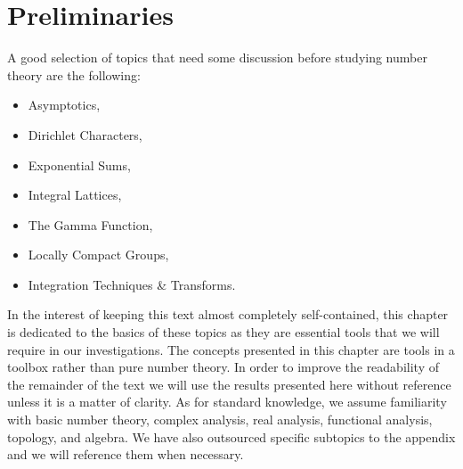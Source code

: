 \chapter{Preliminaries}\label{ch:Preliminaries}
  A good selection of topics that need some discussion before studying number theory are the following:
  \begin{itemize}
    \item Asymptotics,
    \item Dirichlet Characters,
    \item Exponential Sums,
    \item Integral Lattices,
    \item The Gamma Function,
    \item Locally Compact Groups,
    \item Integration Techniques \& Transforms.
  \end{itemize}
  In the interest of keeping this text almost completely self-contained, this chapter is dedicated to the basics of these topics as they are essential tools that we will require in our investigations. The concepts presented in this chapter are tools in a toolbox rather than pure number theory. In order to improve the readability of the remainder of the text we will use the results presented here without reference unless it is a matter of clarity. As for standard knowledge, we assume familiarity with basic number theory, complex analysis, real analysis, functional analysis, topology, and algebra. We have also outsourced specific subtopics to the appendix and we will reference them when necessary.
